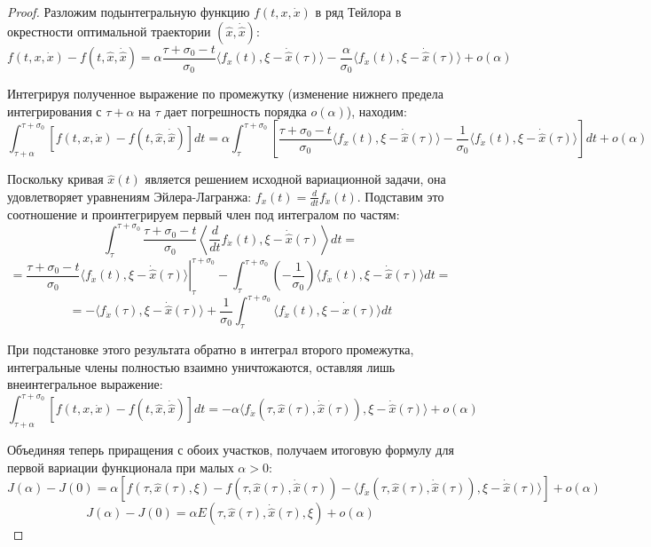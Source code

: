 \begin{proof}
Разложим подынтегральную функцию $f(t, x, \dot{x})$ в ряд Тейлора в окрестности оптимальной траектории $(\hat{x}, \dot{\hat{x}})$:
$$ f(t, x, \dot{x}) - f(t, \hat{x}, \dot{\hat{x}}) = \alpha \frac{\tau + \sigma_0 - t}{\sigma_0} \langle f_x(t), \xi - \dot{\hat{x}}(\tau) \rangle - \frac{\alpha}{\sigma_0} \langle f_{\dot{x}}(t), \xi - \dot{\hat{x}}(\tau) \rangle + o(\alpha) $$

Интегрируя полученное выражение по промежутку (изменение нижнего предела интегрирования с $\tau+\alpha$ на $\tau$ дает погрешность порядка $o(\alpha)$), находим:
\begin{equation}
    \int_{\tau+\alpha}^{\tau+\sigma_0} \left[ f(t, x, \dot{x}) - f(t, \hat{x}, \dot{\hat{x}}) \right] dt = \alpha \int_{\tau}^{\tau+\sigma_0} \left[ \frac{\tau + \sigma_0 - t}{\sigma_0} \langle f_x(t), \xi - \dot{\hat{x}}(\tau) \rangle - \frac{1}{\sigma_0} \langle f_{\dot{x}}(t), \xi - \dot{\hat{x}}(\tau) \rangle \right] dt + o(\alpha)
\end{equation}

Поскольку кривая $\hat{x}(t)$ является решением исходной вариационной задачи, она удовлетворяет уравнениям Эйлера-Лагранжа: $f_x(t) = \frac{d}{dt} f_{\dot{x}}(t)$.
  Подставим это соотношение и проинтегрируем первый член под интегралом по частям:
$$ \int_{\tau}^{\tau+\sigma_0} \frac{\tau + \sigma_0 - t}{\sigma_0} \left\langle \frac{d}{dt} f_{\dot{x}}(t), \xi - \dot{\hat{x}}(\tau) \right\rangle dt = $$
$$ = \left. \frac{\tau + \sigma_0 - t}{\sigma_0} \langle f_{\dot{x}}(t), \xi - \dot{\hat{x}}(\tau) \rangle \right|_{\tau}^{\tau+\sigma_0} - \int_{\tau}^{\tau+\sigma_0} \left( -\frac{1}{\sigma_0} \right) \langle f_{\dot{x}}(t), \xi - \dot{\hat{x}}(\tau) \rangle dt = $$
$$ = -\langle f_{\dot{x}}(\tau), \xi - \dot{\hat{x}}(\tau) \rangle + \frac{1}{\sigma_0} \int_{\tau}^{\tau+\sigma_0} \langle f_{\dot{x}}(t), \xi - \dot{\hat{x}}(\tau) \rangle dt $$

При подстановке этого результата обратно в интеграл второго промежутка, интегральные члены полностью взаимно уничтожаются, оставляя лишь внеинтегральное выражение:
\begin{equation}
    \int_{\tau+\alpha}^{\tau+\sigma_0} \left[ f(t, x, \dot{x}) - f(t, \hat{x}, \dot{\hat{x}}) \right] dt = -\alpha \langle f_{\dot{x}}(\tau, \hat{x}(\tau), \dot{\hat{x}}(\tau)), \xi - \dot{\hat{x}}(\tau) \rangle + o(\alpha)
\end{equation}

Объединяя теперь приращения с обоих участков, получаем итоговую формулу для первой вариации функционала при малых $\alpha > 0$:
\begin{equation}
    J(\alpha) - J(0) = \alpha \left[ f(\tau, \hat{x}(\tau), \xi) - f(\tau, \hat{x}(\tau), \dot{\hat{x}}(\tau)) - \langle f_{\dot{x}}(\tau, \hat{x}(\tau), \dot{\hat{x}}(\tau)), \xi - \dot{\hat{x}}(\tau) \rangle \right] + o(\alpha)
\end{equation}
$$ J(\alpha) - J(0) = \alpha E(\tau, \hat{x}(\tau), \dot{\hat{x}}(\tau), \xi) + o(\alpha) $$


\end{proof}
